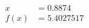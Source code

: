 \documentclass[preview]{standalone}
\begin{document}
\begin{align*}
x &= 0.8874\\f(x) &= 5.4027517
\end{align*}
\end{document}
